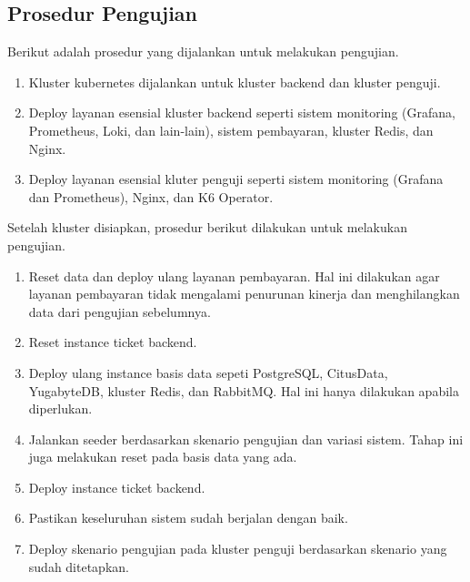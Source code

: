\subsection{Prosedur Pengujian}

Berikut adalah prosedur yang dijalankan untuk melakukan pengujian.

\begin{enumerate}
    \item Kluster kubernetes dijalankan untuk kluster backend dan kluster penguji.
    \item Deploy layanan esensial kluster backend seperti sistem monitoring (Grafana, Prometheus, Loki, dan lain-lain), sistem pembayaran, kluster Redis, dan Nginx.
    \item Deploy layanan esensial kluter penguji seperti sistem monitoring (Grafana dan Prometheus), Nginx, dan K6 Operator.
\end{enumerate}

Setelah kluster disiapkan, prosedur berikut dilakukan untuk melakukan pengujian.

\begin{enumerate}
    \item Reset data dan deploy ulang layanan pembayaran. Hal ini dilakukan agar layanan pembayaran tidak mengalami penurunan kinerja dan menghilangkan data dari pengujian sebelumnya.
    \item Reset instance ticket backend.
    \item Deploy ulang instance basis data sepeti PostgreSQL, CitusData, YugabyteDB, kluster Redis, dan RabbitMQ. Hal ini hanya dilakukan apabila diperlukan.
    \item Jalankan seeder berdasarkan skenario pengujian dan variasi sistem. Tahap ini juga melakukan reset pada basis data yang ada.
    \item Deploy instance ticket backend.
    \item Pastikan keseluruhan sistem sudah berjalan dengan baik.
    \item Deploy skenario pengujian pada kluster penguji berdasarkan skenario yang sudah ditetapkan.
\end{enumerate}
